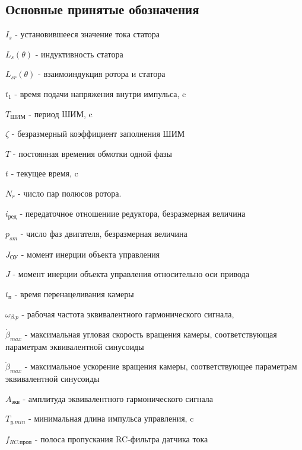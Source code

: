 \subsection{ Основные принятые обозначения }

$I_{s}$ - установившееся значение тока статора

$L_{s}(\theta)$ - индуктивность статора

$L_{sr}(\theta)$ - взаимоиндукция ротора и статора

$t_{1}$ - время подачи напряжения внутри импульса, c

$T_\text{ШИМ}$ - период ШИМ, c

$\zeta$ - безразмерный коэффициент заполнения ШИМ

$T$ - постоянная времения обмотки одной фазы

$t$ - текущее время, c

$N_{r}$ - число пар полюсов ротора.

$i_\text{ред}$ - передаточное отношениие редуктора, безразмерная величина

$p_{sm}$ - число фаз двигателя, безразмерная величина

$J_{\text{ОУ}}$ - момент инерции объекта управления

$J$ - момент инерции объекта управления относительно оси привода

$t_\text{п}$ - время перенацеливания камеры

$\omega_{\beta.p}$ - рабочая частота эквивалентного гармонического сигнала,

$\dot{\beta}_{max}$ - максимальная угловая скорость вращения камеры, соответствующая параметрам эквивалентной синусоиды

$\ddot{\beta}_{max}$ - максимальное ускорение вращения камеры, соответствующее параметрам эквивалентной синусоиды

$A_\text{экв}$ - амплитуда эквивалентного гармонического сигнала

$T_{y.min}$ - минимальная длина импульса управления, c

$f_{RC.\text{проп} }$ - полоса пропускания RC-фильтра датчика тока
